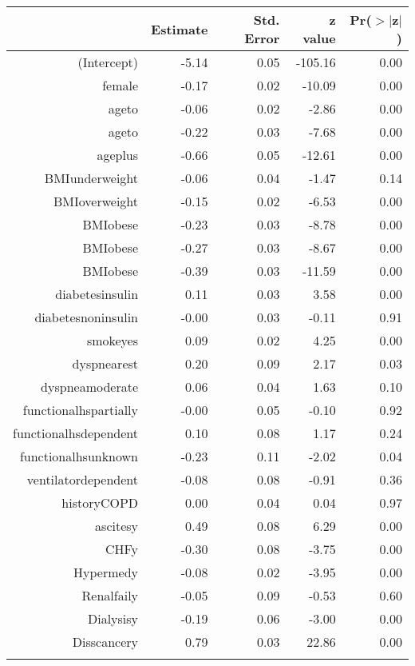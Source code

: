 \bigskip\bigskip
\centering
\begin{tabular}{rrrrr}
  \hline
 & Estimate & Std. Error & z value & Pr($>$$|$z$|$) \\ 
  \hline
(Intercept) & -5.14 & 0.05 & -105.16 & 0.00 \\ 
  female & -0.17 & 0.02 & -10.09 & 0.00 \\ 
  age\-65\-to\-74 & -0.06 & 0.02 & -2.86 & 0.00 \\ 
  age\-75\-to\-84 & -0.22 & 0.03 & -7.68 & 0.00 \\ 
  age\-85\-plus & -0.66 & 0.05 & -12.61 & 0.00 \\ 
  BMI\-underweight & -0.06 & 0.04 & -1.47 & 0.14 \\ 
  BMI\-overweight & -0.15 & 0.02 & -6.53 & 0.00 \\ 
  BMI\-obese\-1 & -0.23 & 0.03 & -8.78 & 0.00 \\ 
  BMI\-obese\-2 & -0.27 & 0.03 & -8.67 & 0.00 \\ 
  BMI\-obese\-3 & -0.39 & 0.03 & -11.59 & 0.00 \\ 
  diabetes\-insulin & 0.11 & 0.03 & 3.58 & 0.00 \\ 
  diabetes\-noninsulin & -0.00 & 0.03 & -0.11 & 0.91 \\ 
  smoke\-yes & 0.09 & 0.02 & 4.25 & 0.00 \\ 
  dyspnea\-rest & 0.20 & 0.09 & 2.17 & 0.03 \\ 
  dyspnea\-moderate & 0.06 & 0.04 & 1.63 & 0.10 \\ 
  functional\-hs\-partially & -0.00 & 0.05 & -0.10 & 0.92 \\ 
  functional\-hs\-dependent & 0.10 & 0.08 & 1.17 & 0.24 \\ 
  functional\-hs\-unknown & -0.23 & 0.11 & -2.02 & 0.04 \\ 
  ventilator\-dependent & -0.08 & 0.08 & -0.91 & 0.36 \\ 
  history\-COPD & 0.00 & 0.04 & 0.04 & 0.97 \\ 
  ascites\-y & 0.49 & 0.08 & 6.29 & 0.00 \\ 
  CHF\-y & -0.30 & 0.08 & -3.75 & 0.00 \\ 
  Hyper\-med\-y & -0.08 & 0.02 & -3.95 & 0.00 \\ 
  Renal\-fail\-y & -0.05 & 0.09 & -0.53 & 0.60 \\ 
  Dialysis\-y & -0.19 & 0.06 & -3.00 & 0.00 \\ 
  Diss\-cancer\-y & 0.79 & 0.03 & 22.86 & 0.00 \\ 
$$
\end{tabular}
